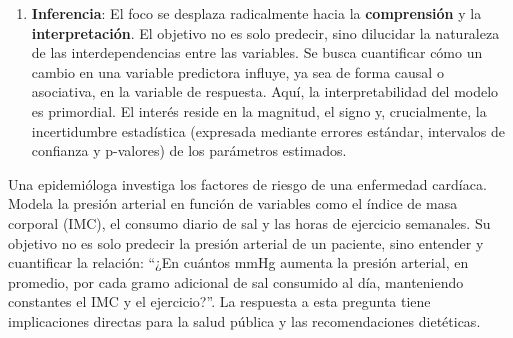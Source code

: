 \documentclass[
  letterpaper,
  DIV=11,
  numbers=noendperiod]{scrreprt}
\providecommand{\tightlist}{%
  \setlength{\itemsep}{0pt}\setlength{\parskip}{0pt}}
\begin{document}
\begin{enumerate}
\def\labelenumi{\arabic{enumi}.}
\setcounter{enumi}{1}
\tightlist
\item
  \textbf{Inferencia}: El foco se desplaza radicalmente hacia la
  \textbf{comprensión} y la \textbf{interpretación}. El objetivo no es
  solo predecir, sino dilucidar la naturaleza de las interdependencias
  entre las variables. Se busca cuantificar cómo un cambio en una
  variable predictora influye, ya sea de forma causal o asociativa, en
  la variable de respuesta. Aquí, la interpretabilidad del modelo es
  primordial. El interés reside en la magnitud, el signo y,
  crucialmente, la incertidumbre estadística (expresada mediante errores
  estándar, intervalos de confianza y p-valores) de los parámetros
  estimados.
\end{enumerate}

\begin{tcolorbox}[enhanced jigsaw, breakable, toprule=.15mm, bottomtitle=1mm, coltitle=black, colbacktitle=quarto-callout-tip-color!10!white, titlerule=0mm, opacitybacktitle=0.6, bottomrule=.15mm, toptitle=1mm, title=\textcolor{quarto-callout-tip-color}{\faLightbulb}\hspace{0.5em}{Ejemplo}, arc=.35mm, rightrule=.15mm, opacityback=0, colframe=quarto-callout-tip-color-frame, leftrule=.75mm, left=2mm, colback=white]

Una epidemióloga investiga los factores de riesgo de una enfermedad
cardíaca. Modela la presión arterial en función de variables como el
índice de masa corporal (IMC), el consumo diario de sal y las horas de
ejercicio semanales. Su objetivo no es solo predecir la presión arterial
de un paciente, sino entender y cuantificar la relación: ``¿En cuántos
mmHg aumenta la presión arterial, en promedio, por cada gramo adicional
de sal consumido al día, manteniendo constantes el IMC y el
ejercicio?''. La respuesta a esta pregunta tiene implicaciones directas
para la salud pública y las recomendaciones dietéticas.

\end{tcolorbox}
\end{document}

